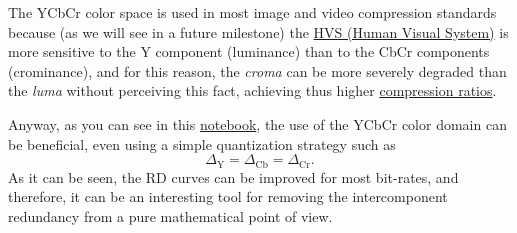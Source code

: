 \begin{comment}
The International Consultative Committee for Radio (CCIR)11 Recommendation 601:
\begin{equation}
\begin{array}
Y ′= 219(+0.299R′ + 0.587G′ + 0.114B′) + 16 \\
CB′= 224(-0.169R′ - 0.331G′ + 0.500B′) + 128 \\
CR′= 224(+0.500R′ - 0.419G′ - 0.081B′) + 128
\end{array}
\end{equation}

0.299*(−0.169) + 0.587*(−0.331) + 0.114*0.500 = -.187828

(-0.169)*0.500 + (-0.331)*(-0.419) + 0.500*(-0.081) = .013689
\end{comment}

The YCbCr color space is used in most image and video compression
standards because (as we will see in a future milestone) the
\href{https://en.wikipedia.org/wiki/Visual_system}{HVS (Human Visual
  System)} is more sensitive to the Y component (luminance) than to
the CbCr components (crominance), and for this reason, the
\emph{croma} can be more severely degraded than the \emph{luma}
without perceiving this fact, achieving thus higher
\href{https://en.wikipedia.org/wiki/Data_compression_ratio}{compression
  ratios}.

Anyway, as you can see in this
\href{https://github.com/Sistemas-Multimedia/Sistemas-Multimedia.github.io/blob/master/study_guide/06-color_transform/performance.ipynb}{notebook},
the use of the YCbCr color domain can be beneficial, even using a
simple quantization strategy such as
\begin{equation}
  \Delta_{\text{Y}} = \Delta_{\text{Cb}} = \Delta_{\text{Cr}}.
\end{equation}
As it can be seen, the RD curves can be improved for most bit-rates,
and therefore, it can be an interesting tool for removing the
intercomponent redundancy from a pure mathematical point of view.

